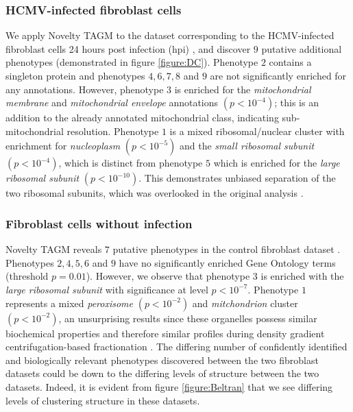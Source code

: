 \documentclass[12pt,english]{article}
\begin{document}
\subsubsection{HCMV-infected fibroblast cells} 
We apply Novelty TAGM to the dataset corresponding to the HCMV-infected fibroblast cells 24 hours post infection (hpi) \citep{Jean_Beltran:2016}, and discover $9$ putative additional phenotypes (demonstrated in figure \ref{figure:DC}). Phenotype $2$ contains a singleton protein and phenotypes $4,6,7,8$ and $9$ are not significantly enriched for any annotations. However, phenotype $3$ is enriched for the \textit{mitochondrial membrane} and  \textit{mitochondrial envelope} annotations $(p < 10^{-4})$; this is an addition to the already annotated mitochondrial class, indicating sub-mitochondrial resolution. Phenotype $1$ is a mixed ribosomal/nuclear cluster with enrichment for \textit{nucleoplasm} $(p < 10^{-5})$ and the \textit{small ribosomal subunit} $(p < 10^{-4})$, which is distinct from phenotype $5$ which is enriched for the \textit{large ribosomal subunit} $(p < 10^{-10})$. This demonstrates unbiased separation of the two ribosomal subunits, which was overlooked in the original analysis \citep{Jean_Beltran:2016}.

\subsubsection{Fibroblast cells without infection} 
Novelty TAGM reveals $7$ putative phenotypes in the control fibroblast dataset \citep{Jean_Beltran:2016}. Phenotypes $2,4,5,6$ and $9$ have no significantly enriched Gene Ontology terms (threshold $p = 0.01$). However, we observe that phenotype $3$ is enriched with the \textit{large ribosomal subunit} with significance at level $p < 10^{-7} $. Phenotype $1$ represents a mixed \textit{peroxisome} $(p < 10^{-2})$ and \textit{mitchondrion} cluster $(p < 10 ^{-2})$, an unsurprising results since these organelles possess similar biochemical properties and therefore similar profiles during density gradient centrifugation-based fractionation \citep{DC:2018, Dealtry:1992}. The differing number of confidently identified and biologically relevant phenotypes discovered between the two fibroblast datasets could be down to the differing levels of structure between the two datasets. Indeed, it is evident from figure \ref{figure:Beltran} that we see differing levels of clustering structure in these datasets.
\end{document}
